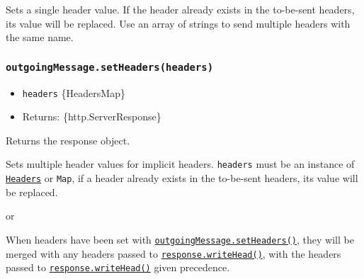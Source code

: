 Sets a single header value. If the header already exists in the
to-be-sent headers, its value will be replaced. Use an array of strings
to send multiple headers with the same name.

\subsubsection{\texorpdfstring{\texttt{outgoingMessage.setHeaders(headers)}}{outgoingMessage.setHeaders(headers)}}\label{outgoingmessage.setheadersheaders}

\begin{itemize}
\tightlist
\item
  \texttt{headers} \{Headers\textbar Map\}
\item
  Returns: \{http.ServerResponse\}
\end{itemize}

Returns the response object.

Sets multiple header values for implicit headers. \texttt{headers} must
be an instance of \href{globals.md\#class-headers}{\texttt{Headers}} or
\texttt{Map}, if a header already exists in the to-be-sent headers, its
value will be replaced.

\begin{Shaded}
\begin{Highlighting}[]
\OperatorTok{=}  \NormalTok{(\{ }\OperatorTok{:} \NormalTok{ \})}\OperatorTok{;}
\OperatorTok{;}
\end{Highlighting}
\end{Shaded}

or

\begin{Shaded}
\begin{Highlighting}[]
\OperatorTok{=}  \NormalTok{([[}\OperatorTok{,} \NormalTok{]])}\OperatorTok{;}
\OperatorTok{;}
\end{Highlighting}
\end{Shaded}

When headers have been set with
\hyperref[outgoingmessagesetheadersheaders]{\texttt{outgoingMessage.setHeaders()}},
they will be merged with any headers passed to
\hyperref[responsewriteheadstatuscode-statusmessage-headers]{\texttt{response.writeHead()}},
with the headers passed to
\hyperref[responsewriteheadstatuscode-statusmessage-headers]{\texttt{response.writeHead()}}
given precedence.


